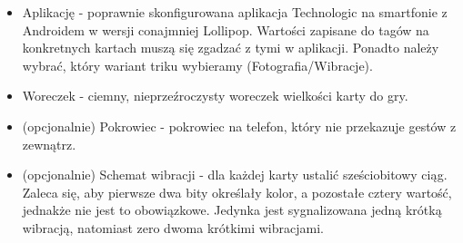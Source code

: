 \begin{itemize}
    \item Aplikację - poprawnie skonfigurowana aplikacja Technologic na smartfonie z Androidem w wersji conajmniej Lollipop. Wartości zapisane do tagów na konkretnych kartach muszą się zgadzać z tymi w aplikacji. Ponadto należy wybrać, który wariant triku wybieramy (Fotografia/Wibracje).
    \item Woreczek - ciemny, nieprzeźroczysty woreczek wielkości karty do gry.
    \item (opcjonalnie) Pokrowiec - pokrowiec na telefon, który nie przekazuje gestów z zewnątrz.
    \item (opcjonalnie) Schemat wibracji - dla każdej karty ustalić sześciobitowy ciąg. Zaleca się, aby pierwsze dwa bity określały kolor, a pozostałe cztery wartość, jednakże nie jest to obowiązkowe. Jedynka jest sygnalizowana jedną krótką wibracją, natomiast zero dwoma krótkimi wibracjami.
\end{itemize}

